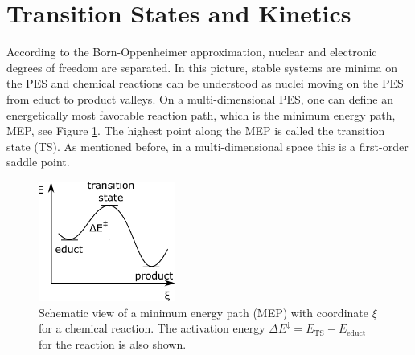 \documentclass[11pt,DIV=13,BCOR=5mm,a4paper,headinclude]{scrbook}
\begin{document}
\section{Transition States and Kinetics}\label{sec:tst}
According to the Born-Oppenheimer approximation\cite{bornoppenheimer}, nuclear and electronic degrees of freedom are separated.
In this picture, stable systems are minima on the PES and chemical reactions can be understood as nuclei moving on the PES from educt to product valleys.
On a multi-dimensional PES, one can define an energetically most favorable reaction path, which is the minimum energy path, MEP, see Figure \ref{abb:mep}.
The highest point along the MEP is called the transition state (TS).
As mentioned before, in a multi-dimensional space this is a first-order saddle point.
\begin{figure}[!h]
\centering
 \includegraphics[width=0.4\textwidth]{figures/theory/MEP.pdf}
   \caption{Schematic view of a minimum energy path (MEP) with coordinate $\xi$ for a chemical reaction.
The activation energy $\Delta E^\ddagger= E_\textrm{TS}- E_\textrm{educt}$ for the reaction is also shown.}
            \label{abb:mep}
\end{figure}
\end{document}
